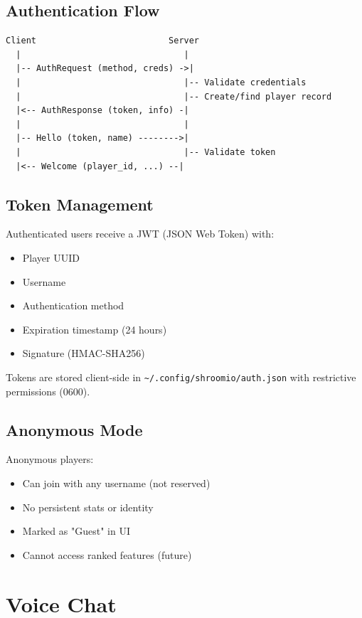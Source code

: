 \documentclass[11pt]{article}
\begin{document}
\subsection{Authentication Flow}

\begin{verbatim}
Client                          Server
  |                                |
  |-- AuthRequest (method, creds) ->|
  |                                |-- Validate credentials
  |                                |-- Create/find player record
  |<-- AuthResponse (token, info) -|
  |                                |
  |-- Hello (token, name) -------->|
  |                                |-- Validate token
  |<-- Welcome (player_id, ...) --|
\end{verbatim}

\subsection{Token Management}

Authenticated users receive a JWT (JSON Web Token) with:
\begin{itemize}
  \item Player UUID
  \item Username
  \item Authentication method
  \item Expiration timestamp (24 hours)
  \item Signature (HMAC-SHA256)
\end{itemize}

Tokens are stored client-side in \texttt{\textasciitilde/.config/shroomio/auth.json} with restrictive permissions (0600).

\subsection{Anonymous Mode}

Anonymous players:
\begin{itemize}
  \item Can join with any username (not reserved)
  \item No persistent stats or identity
  \item Marked as "Guest" in UI
  \item Cannot access ranked features (future)
\end{itemize}

\section{Voice Chat}
\end{document}
